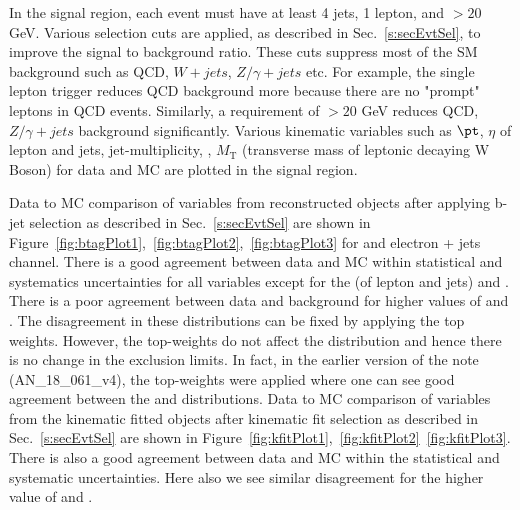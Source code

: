 In the signal region, each event must have at least 4 jets, 1 lepton, and 
\MET$ > 20$ GeV. Various selection cuts are applied, as described in 
Sec.~\ref{s:secEvtSel}, to improve the signal to background ratio. These cuts 
suppress most of the SM background such as QCD, $W + jets$, $Z/\gamma + jets$ 
etc. For example, the single lepton trigger reduces QCD background more because 
there are no "prompt" leptons in QCD events. Similarly, a requirement of \MET$ > 
20$ GeV reduces QCD, $Z/\gamma + jets$ background significantly. Various 
kinematic variables such as $\pt$, $\eta$ of lepton and jets, jet-multiplicity, 
\MET, $M_{\text{T}}$ (transverse mass of leptonic decaying W Boson) for data and 
MC are plotted in the signal region. 

Data to MC comparison of variables from reconstructed objects after applying 
b-jet selection as described in Sec.~\ref{s:secEvtSel} are shown in 
Figure~\ref{fig:btagPlot1},~\ref{fig:btagPlot2},~\ref{fig:btagPlot3} for \mujets and electron + 
jets channel. There is a good agreement between data and MC within statistical 
and systematics uncertainties for all variables except for the \pt (of lepton 
and jets) and \MET. There is a poor agreement between data and background for 
higher values of \pt and \MET. The disagreement in these distributions can be 
fixed by applying the top \pt weights. However, the top-\pt weights do not affect 
the \mjj distribution and hence there is no change in the exclusion limits. 
In fact, in the earlier version of the note (AN\_18\_061\_v4), the top-\pt weights 
were applied where one can see good agreement between the \pt and \MET 
distributions. Data to MC comparison of variables from the kinematic fitted 
objects after kinematic fit selection as described in Sec.~\ref{s:secEvtSel} are 
shown in Figure~\ref{fig:kfitPlot1},~\ref{fig:kfitPlot2}~\ref{fig:kfitPlot3}. There is also a good 
agreement between data and MC within the statistical and systematic uncertainties. 
Here also we see similar disagreement for the higher value of \pt and \MET.

